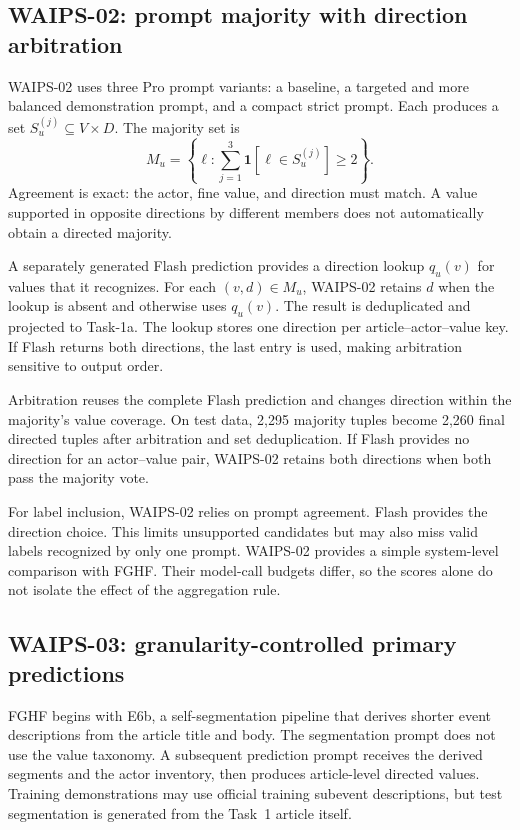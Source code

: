 \documentclass[12pt,a4paper]{article}
\begin{document}
\subsection{WAIPS-02: prompt majority with direction arbitration}
WAIPS-02 uses three Pro prompt variants: a baseline, a targeted and more balanced demonstration prompt, and a compact strict prompt. Each produces a set $S_u^{(j)}\subseteq V\times D$. The majority set is
\begin{equation}
M_u=\left\{\ell:\sum_{j=1}^{3}\mathbf{1}[\ell\in S_u^{(j)}]\geq2\right\}.
\label{eq:majority}
\end{equation}
Agreement is exact: the actor, fine value, and direction must match. A value supported in opposite directions by different members does not automatically obtain a directed majority.

A separately generated Flash prediction provides a direction lookup $q_u(v)$ for values that it recognizes. For each $(v,d)\in M_u$, WAIPS-02 retains $d$ when the lookup is absent and otherwise uses $q_u(v)$. The result is deduplicated and projected to Task-1a. The lookup stores one direction per article--actor--value key. If Flash returns both directions, the last entry is used, making arbitration sensitive to output order.

Arbitration reuses the complete Flash prediction and changes direction within the majority's value coverage. On test data, 2,295 majority tuples become 2,260 final directed tuples after arbitration and set deduplication. If Flash provides no direction for an actor--value pair, WAIPS-02 retains both directions when both pass the majority vote.

For label inclusion, WAIPS-02 relies on prompt agreement. Flash provides the direction choice. This limits unsupported candidates but may also miss valid labels recognized by only one prompt. WAIPS-02 provides a simple system-level comparison with FGHF. Their model-call budgets differ, so the scores alone do not isolate the effect of the aggregation rule.

\subsection{WAIPS-03: granularity-controlled primary predictions}
FGHF begins with E6b, a self-segmentation pipeline that derives shorter event descriptions from the article title and body. The segmentation prompt does not use the value taxonomy. A subsequent prediction prompt receives the derived segments and the actor inventory, then produces article-level directed values. Training demonstrations may use official training subevent descriptions, but test segmentation is generated from the Task~1 article itself.
\end{document}

